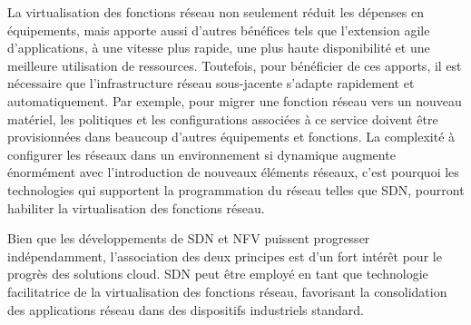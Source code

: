 


La virtualisation des fonctions réseau non seulement réduit les dépenses en équipements, mais apporte aussi d'autres bénéfices tels que l'extension agile d'applications, à une vitesse plus rapide, une plus haute disponibilité et une meilleure utilisation de ressources. Toutefois, pour bénéficier de ces apports, il est nécessaire que l'infrastructure réseau sous-jacente s'adapte rapidement et automatiquement. Par exemple, pour migrer une fonction réseau vers un nouveau matériel, les politiques et les configurations associées à ce service doivent être provisionnées dans beaucoup d'autres équipements et fonctions. La complexité à configurer les réseaux dans un environnement si dynamique augmente énormément avec l'introduction de nouveaux éléments réseaux, c'est pourquoi les technologies qui supportent la programmation du réseau telles que SDN, pourront habiliter la virtualisation des fonctions réseau.


Bien que les développements de SDN et NFV puissent progresser indépendamment, l'association des deux principes est d'un fort intérêt pour le progrès des solutions cloud. SDN peut être employé en tant que technologie facilitatrice de la virtualisation des fonctions réseau, favorisant la consolidation des applications réseau dans des dispositifs industriels standard. \cite{OFSDNNFVintro} \cite{realTimeCloudNFV} \cite{IntelCloudEPC}

